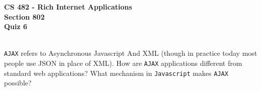 \documentclass[letterpaper]{exam}
\begin{document}
\begin{center}
	\textbf{CS 482 - Rich Internet Applications} \\
	\textbf{Section 802} \\
	\textbf{Quiz 6} \\
	\vspace{5mm}
	 \\
\end{center}


\begin{questions}
	\question[10] \texttt{AJAX} refers to Asynchronous Javascript And XML (though in practice today most people use JSON in place of XML). How are \texttt{AJAX} applications different from standard web applications? What mechanism in \texttt{Javascript} makes \texttt{AJAX} possible?
	
\end{questions}
\end{document}
